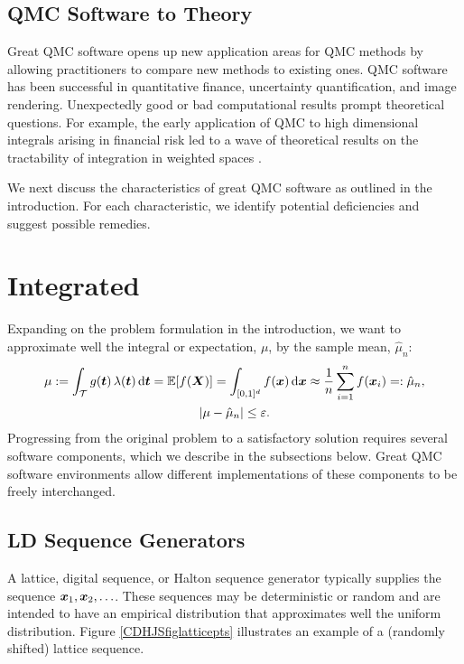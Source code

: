 \documentclass[graybox]{svmult}
\begin{document}
\subsection{QMC Software to Theory}

Great QMC software opens up new application areas for QMC methods by allowing practitioners to compare new methods to existing ones.  QMC software has been successful in quantitative finance, uncertainty quantification, and image rendering. Unexpectedly good or bad computational results prompt theoretical questions.  For example, the early application of QMC to high dimensional integrals arising in financial risk \cite{PasTra95} led to a wave of theoretical results on the tractability of integration in weighted spaces \cite{Woz99a,DicEtal14a,NovWoz10a}.

\bigskip

We next discuss the characteristics of great QMC software as outlined in the introduction.  For each characteristic, we identify potential deficiencies and suggest possible remedies.

\section{Integrated} \label{CDHJS_sec:integrated}

Expanding on the problem formulation in the introduction, we want to approximate well the integral or expectation, $\mu$, by the sample mean, $\hat{\mu}_n$:
\begin{gather}
\label{CDHJSeq:cubSummary}
	\mu : = \int_\calT g(\bst) \, \lambda(\bst) \, \D \bst  = \bbE[f(\bsX)] = \int_{[0,1]^d} f(\bsx)  \, \D \bsx \approx \frac 1n \sum_{i=1}^{n} f(\bsx_i) =: \hat{\mu}_n, \\
 \label{CDHJS_eq:error_tol}
 \abs{\mu - \hat{\mu}_n} \le \varepsilon.
\end{gather}
Progressing from the original problem to a satisfactory solution requires several software components, which we describe in the subsections below.  Great QMC software environments allow different implementations of these components to be freely interchanged.

\subsection{LD Sequence Generators} A lattice, digital sequence, or Halton sequence generator typically supplies the sequence ${\boldsymbol{x}}_1, {\boldsymbol{x}}_2, \ldots$.  These sequences may be deterministic or random and are intended to have an empirical distribution that approximates well the uniform distribution.  Figure \ref{CDHJSfiglatticepts} illustrates an example of a (randomly shifted) lattice sequence.
\end{document}
